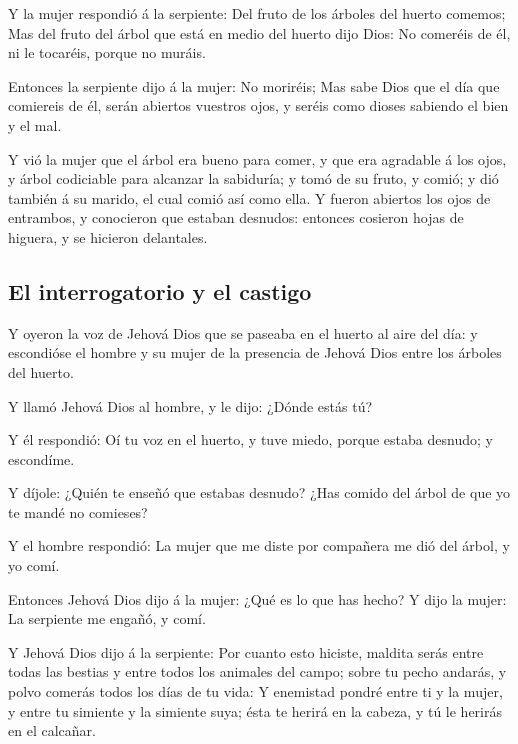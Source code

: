  Y la mujer respondió á la serpiente: Del fruto de los
árboles del huerto comemos;  Mas del fruto del árbol que
está en medio del huerto dijo Dios: No comeréis de él, ni le tocaréis,
porque no muráis.

 Entonces la serpiente dijo á la mujer: No moriréis;
 Mas sabe Dios que el día que comiereis de él, serán
abiertos vuestros ojos, y seréis como dioses sabiendo el bien y el mal.

 Y vió la mujer que el árbol era bueno para comer, y que
era agradable á los ojos, y árbol codiciable para alcanzar la sabiduría;
y tomó de su fruto, y comió; y dió también á su marido, el cual comió
así como ella.  Y fueron abiertos los ojos de entrambos, y
conocieron que estaban desnudos: entonces cosieron hojas de higuera, y
se hicieron delantales.

\hypertarget{el-interrogatorio-y-el-castigo}{%
\subsection{El interrogatorio y el
castigo}\label{el-interrogatorio-y-el-castigo}}

 Y oyeron la voz de Jehová Dios que se paseaba en el
huerto al aire del día: y escondióse el hombre y su mujer de la
presencia de Jehová Dios entre los árboles del huerto.

 Y llamó Jehová Dios al hombre, y le dijo: ¿Dónde estás
tú?

 Y él respondió: Oí tu voz en el huerto, y tuve miedo,
porque estaba desnudo; y escondíme.

 Y díjole: ¿Quién te enseñó que estabas desnudo? ¿Has
comido del árbol de que yo te mandé no comieses?

 Y el hombre respondió: La mujer que me diste por
compañera me dió del árbol, y yo comí.

 Entonces Jehová Dios dijo á la mujer: ¿Qué es lo que has
hecho? Y dijo la mujer: La serpiente me engañó, y comí.

 Y Jehová Dios dijo á la serpiente: Por cuanto esto
hiciste, maldita serás entre todas las bestias y entre todos los
animales del campo; sobre tu pecho andarás, y polvo comerás todos los
días de tu vida:  Y enemistad pondré entre ti y la mujer,
y entre tu simiente y la simiente suya; ésta te herirá en la cabeza, y
tú le herirás en el calcañar.


